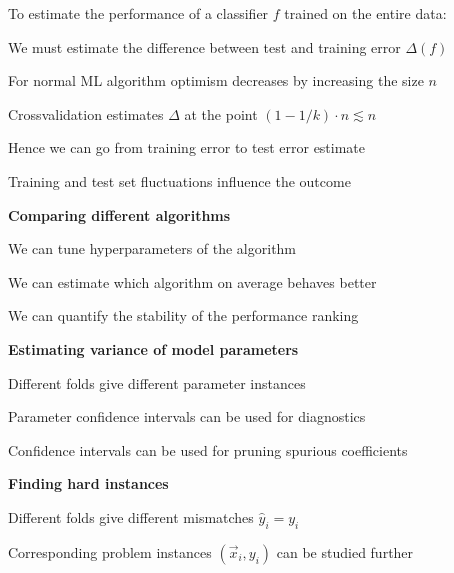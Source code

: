 \documentclass[landscape,footrule]{foils}
\begin{document}
To estimate the performance of a classifier $f$ trained on the entire data:
\begin{triangles}
\item We must estimate the difference between test and training error $\Delta(f)$
\item For normal ML algorithm optimism decreases by increasing the size $n$
\item Crossvalidation estimates $\Delta$ at the point $(1-1/k)\cdot n \lesssim n$ 
\item Hence we can go from training error to test error estimate
\item Training and test set fluctuations influence the outcome  
\end{triangles} 


\textbf{Comparing different algorithms}
\begin{triangles}
\item We can tune hyperparameters of the algorithm
\item We can estimate which algorithm on average behaves better
\item We can quantify the stability of the performance ranking\vspace*{0.5cm}
\end{triangles} 

\textbf{Estimating variance of model parameters}
\begin{triangles}
\item Different folds give different parameter instances
\item Parameter confidence intervals can be used for diagnostics
\item Confidence intervals can be used for pruning spurious coefficients\vspace*{0.5cm}
\end{triangles} 

\textbf{Finding hard instances}
\begin{triangles}
\item Different folds give different mismatches $\hat{y}_i= y_i$
\item Corresponding problem instances $(\vec{x}_i, y_i)$ can be studied further
\end{triangles}
\end{document}

